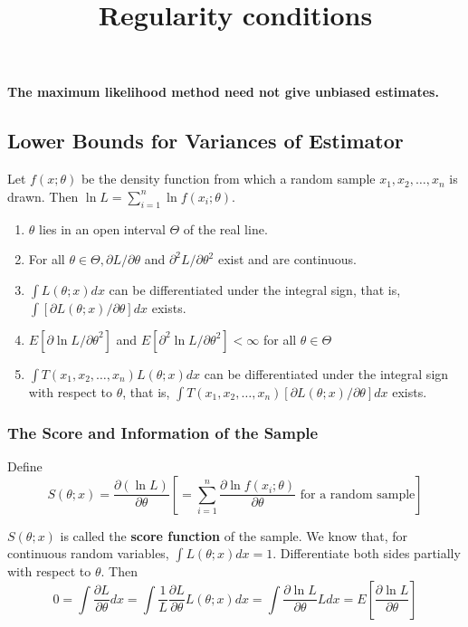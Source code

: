 \documentclass{article}
\begin{document}
\textbf{The maximum likelihood method need not give unbiased estimates.}

\subsection{Lower Bounds for Variances of Estimator}

Let \(f(x;\theta)\) be the density function from which a random sample \(x_1,x_2,\dots,x_n\) is drawn. Then \(\ln L=\sum_{i=1}^n \ln{f(x_i;\theta)}\).\\

\title{\textbf{Regularity conditions}}
\begin{enumerate}
    \item \(\theta\) lies in an open interval \(\Theta\) of the real line.
    \item For all \(\theta \in \Theta, \partial L/\partial \theta\) and \(\partial^2 L/\partial \theta^2\) exist and are continuous.
    \item \(\int L(\theta;x)dx\) can be differentiated under the integral sign, that is, \(\int [\partial L(\theta;x)/\partial \theta]dx\) exists.
    \item \(E[{\partial \ln{L}/\partial \theta}^2]\) and \(E[\partial^2 \ln{L}/\partial \theta^2]<\infty\) for all \(\theta \in \Theta\)
    \item \(\int T(x_1,x_2,\dots,x_n) L(\theta;x) dx\) can be differentiated under the integral sign with respect to \(\theta\), that is, \(\int T(x_1,x_2,\dots,x_n) [\partial L(\theta;x)/\partial \theta] dx\) exists.    
\end{enumerate}

\subsubsection{The Score and Information of the Sample}

Define
\begin{equation*}
    S(\theta;x)=\frac{\partial(\ln{L})}{\partial \theta} \left[=\sum_{i=1}^n \frac{\partial \ln{f(x_i;\theta)}}{\partial \theta} \text{ for a random sample} \right]
\end{equation*}

\(S(\theta;x)\) is called the \textbf{score function} of the sample. We know that, for continuous random variables, \(\int L(\theta;x)dx=1\). Differentiate both sides partially with respect to \(\theta\). Then
\begin{equation*}
    0=\int \frac{\partial L}{\partial \theta} dx=\int \frac{1}{L} \frac{\partial L}{\partial \theta} L(\theta;x) dx = \int \frac{\partial \ln{L}}{\partial \theta} L dx=E \left[\frac{\partial \ln{L}}{\partial \theta}\right]
\end{equation*}
\end{document}
